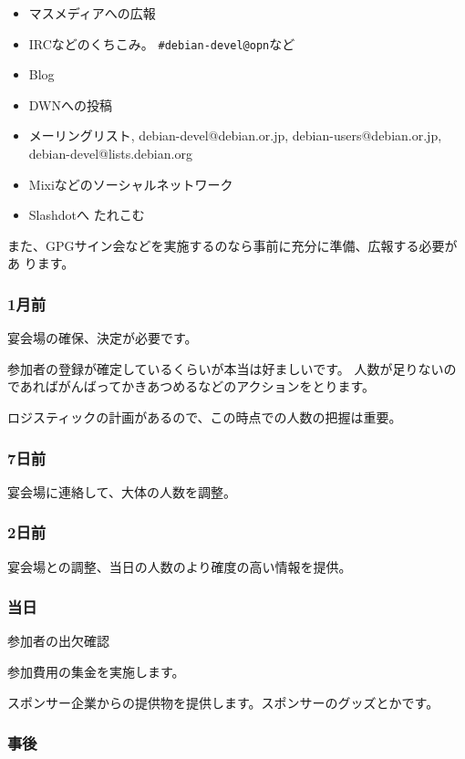 \documentclass[mingoth,a4paper]{jsarticle}
\begin{document}
\begin{itemize}
 \item マスメディアへの広報
 \item IRCなどのくちこみ。
       \verb!#debian-devel@opn!など
 \item Blog
 \item DWNへの投稿
 \item メーリングリスト, debian-devel@debian.or.jp,
       debian-users@debian.or.jp, debian-devel@lists.debian.org
 \item Mixiなどのソーシャルネットワーク
 \item Slashdotへ たれこむ
\end{itemize}

また、GPGサイン会などを実施するのなら事前に充分に準備、広報する必要があ
ります。

\subsubsection{1月前}

宴会場の確保、決定が必要です。

参加者の登録が確定しているくらいが本当は好ましいです。
人数が足りないのであればがんばってかきあつめるなどのアクションをとります。

ロジスティックの計画があるので、この時点での人数の把握は重要。

\subsubsection{7日前}

宴会場に連絡して、大体の人数を調整。

\subsubsection{2日前}

宴会場との調整、当日の人数のより確度の高い情報を提供。

\subsubsection{当日}

参加者の出欠確認

参加費用の集金を実施します。

スポンサー企業からの提供物を提供します。スポンサーのグッズとかです。

\subsubsection{事後}
\end{document}

